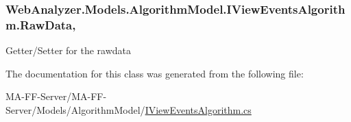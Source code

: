 \subsubsection[{Raw\+Data}]{ Web\+Analyzer.\+Models.\+Algorithm\+Model.\+I\+View\+Events\+Algorithm.\+Raw\+Data\hspace{0.3cm}{\ttfamily [get]}, {\ttfamily [set]}}\label{class_web_analyzer_1_1_models_1_1_algorithm_model_1_1_i_view_events_algorithm_a1fbc48724f9cc7bea3d6ee03d9d533eb}


Getter/\+Setter for the rawdata 



The documentation for this class was generated from the following file\+:\begin{DoxyCompactItemize}
\item 
M\+A-\/\+F\+F-\/\+Server/\+M\+A-\/\+F\+F-\/\+Server/\+Models/\+Algorithm\+Model/\hyperlink{_i_view_events_algorithm_8cs}{I\+View\+Events\+Algorithm.\+cs}\end{DoxyCompactItemize}

